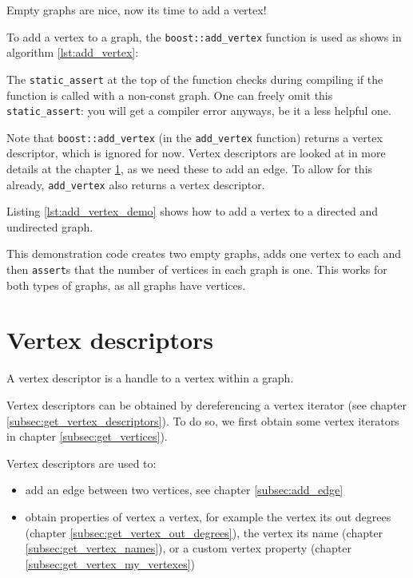 Empty graphs are nice, now its time to add a vertex!

To add a vertex to a graph, 
the \verb;boost::add_vertex; 
function is used as shows in algorithm \ref{lst:add_vertex}:



The \verb;static_assert; 
at the top of the function checks during compiling if the function is called
with a non-const graph.
One can freely omit this \verb;static_assert;: you will get a compiler error anyways,
be it a less helpful one.

Note that \verb;boost::add_vertex; (in the \verb;add_vertex; function) 
returns a vertex
descriptor, which is ignored for now.
Vertex descriptors are looked at in more details 
at the chapter \ref{subsec:Vertex-descriptors}, 
as we need these to add an edge.
To allow for this already, \verb;add_vertex; also returns a vertex descriptor.

Listing \ref{lst:add_vertex_demo}
shows how to add a vertex to a directed and undirected graph.



This demonstration code creates two empty graphs, adds one vertex to each
and then \verb;assert;s that the number of vertices in each graph is one.
This works for both types of graphs, as all graphs have vertices.

\section{Vertex descriptors}
\label{subsec:Vertex-descriptors}

A vertex descriptor is a handle to a vertex within a graph.

Vertex descriptors can be obtained by dereferencing a vertex iterator (see
chapter \ref{subsec:get_vertex_descriptors}).
To do so, we first obtain some vertex iterators in chapter 
\ref{subsec:get_vertices}).
 
Vertex descriptors are used to:

\begin{itemize}
  \item add an edge between two vertices, see chapter \ref{subsec:add_edge}
  \item obtain properties of vertex a vertex, 
    for example the vertex its out degrees (chapter \ref{subsec:get_vertex_out_degrees}), 
    the vertex its name (chapter \ref{subsec:get_vertex_names}), 
    or a custom vertex property (chapter \ref{subsec:get_vertex_my_vertexes})
\end{itemize}

